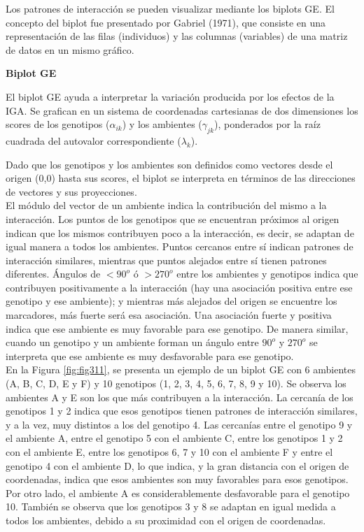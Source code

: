 Los patrones de interacción se pueden visualizar mediante los biplots GE. El concepto del biplot fue presentado por Gabriel (1971), que consiste en una representación de las filas (individuos) y las columnas (variables) de una matriz de datos en un mismo gráfico. 

\textbf{Biplot GE}

El biplot GE ayuda a interpretar la variación producida por los efectos de la IGA. Se grafican en un sistema de coordenadas cartesianas de dos dimensiones los scores de los genotipos ($\alpha_{ik}$) y los ambientes ($\gamma_{jk}$), ponderados por la raíz cuadrada del autovalor correspondiente ($\lambda_k$).

Dado que los genotipos y los ambientes son definidos como vectores desde el origen (0,0) hasta sus scores, el biplot se interpreta en términos de las direcciones de vectores y sus proyecciones.\\

El módulo del vector de un ambiente indica la contribución del mismo a la interacción. Los puntos de los genotipos que se encuentran próximos al origen indican que los mismos contribuyen poco a la interacción, es decir, se adaptan de igual manera a todos los ambientes. Puntos cercanos entre sí indican patrones de interacción similares, mientras que puntos alejados entre sí tienen patrones diferentes. Ángulos de $< 90^o$ ó $> 270^o$ entre los ambientes y genotipos indica que contribuyen positivamente a la interacción (hay una asociación positiva entre ese genotipo y ese ambiente); y mientras más alejados del origen se encuentre los marcadores, más fuerte será esa asociación. Una asociación fuerte y positiva indica que ese ambiente es muy favorable para ese genotipo. De manera similar, cuando un genotipo y un ambiente forman un ángulo entre $90^o$ y $270^o$ se interpreta que ese ambiente es muy desfavorable para ese genotipo.\\


En la Figura \ref{fig:fig311}, se presenta un ejemplo de un biplot GE con 6 ambientes (A, B, C, D, E y F) y 10 genotipos (1, 2, 3, 4, 5, 6, 7, 8, 9 y 10). Se observa los ambientes A y E son los que más contribuyen a la interacción. La cercanía de los genotipos 1 y 2 indica que esos genotipos tienen patrones de interacción similares, y a la vez, muy distintos a los del genotipo 4. Las cercanías entre el genotipo 9 y el ambiente A, entre el genotipo 5 con el ambiente C, entre los genotipos 1 y 2 con el ambiente E, entre los genotipos 6, 7 y 10 con el ambiente F y entre el genotipo 4 con el ambiente D, lo que indica, y la gran distancia con el origen de coordenadas, indica que esos ambientes son muy favorables para esos genotipos. Por otro lado, el ambiente A es considerablemente desfavorable para el genotipo 10. También se observa que los genotipos 3 y 8 se adaptan en igual medida a todos los ambientes, debido a su proximidad con el origen de coordenadas.


